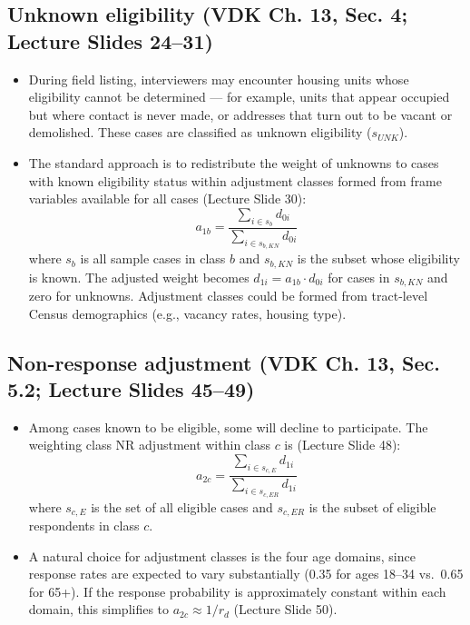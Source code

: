 \documentclass[
  11pt,
]{article}
\begin{document}
\subsection{Unknown eligibility (VDK Ch. 13, Sec. 4; Lecture Slides
24--31)}\label{unknown-eligibility-vdk-ch.-13-sec.-4-lecture-slides-2431}

\begin{itemize}
\item
  During field listing, interviewers may encounter housing units whose
  eligibility cannot be determined --- for example, units that appear
  occupied but where contact is never made, or addresses that turn out
  to be vacant or demolished. These cases are classified as unknown
  eligibility (\(s_{UNK}\)).
\item
  The standard approach is to redistribute the weight of unknowns to
  cases with known eligibility status within adjustment classes formed
  from frame variables available for all cases (Lecture Slide 30):
  \[a_{1b} = \frac{\sum_{i \in s_b} d_{0i}}{\sum_{i \in s_{b,KN}} d_{0i}}\]
  where \(s_b\) is all sample cases in class \(b\) and \(s_{b,KN}\) is
  the subset whose eligibility is known. The adjusted weight becomes
  \(d_{1i} = a_{1b} \cdot d_{0i}\) for cases in \(s_{b,KN}\) and zero
  for unknowns. Adjustment classes could be formed from tract-level
  Census demographics (e.g., vacancy rates, housing type).
\end{itemize}

\subsection{Non-response adjustment (VDK Ch. 13, Sec. 5.2; Lecture
Slides
45--49)}\label{non-response-adjustment-vdk-ch.-13-sec.-5.2-lecture-slides-4549}

\begin{itemize}
\item
  Among cases known to be eligible, some will decline to participate.
  The weighting class NR adjustment within class \(c\) is (Lecture Slide
  48):
  \[a_{2c} = \frac{\sum_{i \in s_{c,E}} d_{1i}}{\sum_{i \in s_{c,ER}} d_{1i}}\]
  where \(s_{c,E}\) is the set of all eligible cases and \(s_{c,ER}\) is
  the subset of eligible respondents in class \(c\).
\item
  A natural choice for adjustment classes is the four age domains, since
  response rates are expected to vary substantially (0.35 for ages
  18--34 vs.~0.65 for 65+). If the response probability is approximately
  constant within each domain, this simplifies to
  \(a_{2c} \approx 1/r_d\) (Lecture Slide 50).
\end{itemize}
\end{document}
